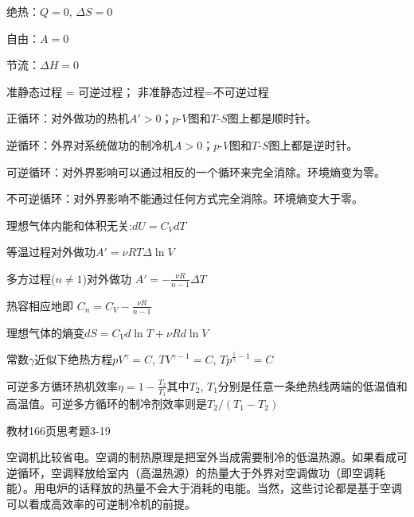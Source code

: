 \documentclass[CJK]{beamer}
\begin{document}
\begin{frame}
\end{frame}

\begin{frame}
  \bch
  \bitem
\item{绝热：$Q  = 0$,  $\Delta S = 0$}
\item{自由：$A=0$}
\item{节流：$\Delta H = 0$}
\item{准静态过程 = 可逆过程； 非准静态过程=不可逆过程}
\item{正循环：对外做功的热机$A'>0$；$p$-$V$图和$T$-$S$图上都是顺时针。}
\item{逆循环：外界对系统做功的制冷机$A>0$；$p$-$V$图和$T$-$S$图上都是逆时针。}
\item{可逆循环：对外界影响可以通过相反的一个循环来完全消除。环境熵变为零。}
\item{不可逆循环：对外界影响不能通过任何方式完全消除。环境熵变大于零。}
\eitem
  \ech  
\end{frame}

\begin{frame}
  \bch
  \bitem
  \item{理想气体内能和体积无关:$dU = C_V dT$}
  \item{等温过程对外做功$A'=\nu RT \Delta \ln V$}
  \item{
  多方过程($n\ne 1$)对外做功
  $A' = -\frac{\nu R}{n-1}\Delta T$
  
  热容相应地即
  $C_n = C_V - \frac{\nu R}{n-1}$}
  \item{理想气体的熵变$ dS = C_V d \ln T + \nu R d\ln V$}
  \item{常数$\gamma$近似下绝热方程$pV^\gamma = C$, $TV^{\gamma-1} =C$, $Tp^{\frac{1}{\gamma}-1} = C$}
  \item{可逆多方循环热机效率$\eta = 1- \frac{T_2}{T_1}$其中$T_2$, $T_1$分别是任意一条绝热线两端的低温值和高温值。可逆多方循环的制冷剂效率则是$T_2/(T_1-T_2)$}
  \eitem
  \ech  
\end{frame}


\begin{frame}
  \bch
  教材166页思考题3-19
  \ech
\end{frame}


\begin{frame}
  \bch
  空调机比较省电。空调的制热原理是把室外当成需要制冷的低温热源。如果看成可逆循环，空调释放给室内（高温热源）的热量大于外界对空调做功（即空调耗能）。用电炉的话释放的热量不会大于消耗的电能。当然，这些讨论都是基于空调可以看成高效率的可逆制冷机的前提。
  \ech
\end{frame}
\end{document}
